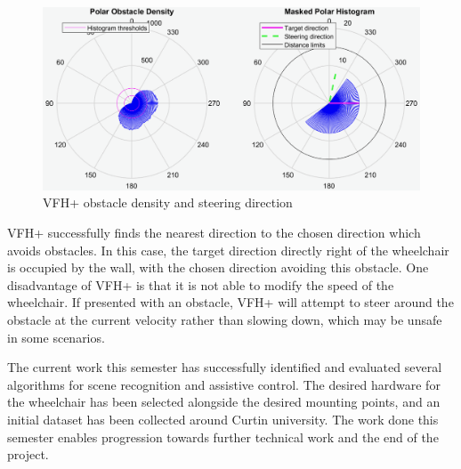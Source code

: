 \begin{figure}[H]
    \centering
    \includegraphics[width=0.65\linewidth]{images/vfh_controller.png}
    \caption{VFH+ obstacle density and steering direction}
    \label{fig:vfh_controller}
\end{figure}

VFH+ successfully finds the nearest direction to the chosen direction which avoids obstacles.
In this case, the target direction directly right of the wheelchair is
occupied by the wall, with the chosen direction avoiding this obstacle.
One disadvantage of VFH+ is that it is not able to modify the speed of the wheelchair.
If presented with an obstacle, VFH+ will attempt to steer around the obstacle at the current velocity rather than
slowing down, which may be unsafe in some scenarios.

The current work this semester has successfully identified and evaluated several algorithms for scene recognition and assistive control.
The desired hardware for the wheelchair has been selected alongside the desired mounting points, and an initial dataset has
been collected around Curtin university.
The work done this semester enables progression towards further technical work and the end of the project.
